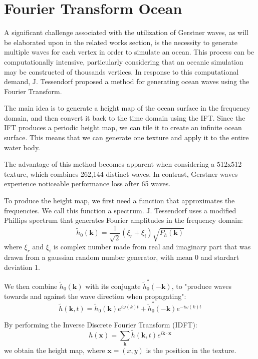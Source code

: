 \section{Fourier Transform Ocean}
A significant challenge associated with the utilization of Gerstner waves, as will be elaborated upon in the related works section, is the necessity to generate multiple waves for each vertex in order to simulate an ocean. This process can be computationally intensive, particularly considering that an oceanic simulation may be constructed of thousands vertices. In response to this computational demand, J. Tessendorf \cite{tessendorf2001} proposed a method for generating ocean waves using the Fourier Transform.

The main idea is to generate a height map of the ocean surface in the frequency domain, and then convert it back to the time domain using the IFT. Since the IFT produces a periodic height map, we can tile it to create an infinite ocean surface. This means that we can generate one texture and apply it to the entire water body.

The advantage of this method becomes apparent when considering a 512x512 texture, which combines 262,144 distinct waves. In contrast, Gerstner waves experience noticeable performance loss after 65 waves.

To produce the height map, we first need a function that approximates the frequencies. We call this function a spectrum. J. Tessendorf uses a modified Phillips spectrum that generates Fourier amplitudes in the frequency domain:
\begin{equation}
    \tilde{h}_0(\mathbf{k}) = \frac{1}{\sqrt{2}}(\xi_r + \xi_i)\sqrt{P_h(\mathbf{k})}
    \label{eq:fouier_amplitudes}
\end{equation}
where $\xi_r$ and $\xi_i$ is complex number made from real and imaginary part that was drawn from a gaussian random number generator, with mean 0 and stardart deviation 1.

We then combine $\tilde{h}_0(\mathbf{k})$ with its conjugate $\tilde{h}^{*}_0(-\mathbf{k})$, to "produce waves towards and against the wave direction when propagating"\cite{horvath2015}:
\begin{equation}
    \tilde{h}(\mathbf{k}, t) = \tilde{h}_0(\mathbf{k})e^{i\omega(k)t}+\tilde{h}^{*}_0(-\mathbf{k})e^{-i\omega(k)t}
    \label{eq:combined_amplitudes}
\end{equation}

By performing the Inverse Discrete Fourier Transform (IDFT):
\begin{equation}
    h(\mathbf{x}) = \sum_{\mathbf{k}} \tilde{h}(\mathbf{k}, t)e^{i\mathbf{k}\cdot\mathbf{x}}
    \label{eq:height_map}
\end{equation}
we obtain the height map, where $\mathbf{x}=(x,y)$ is the position in the texture.

